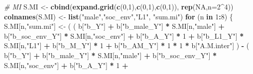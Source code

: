 \documentclass[
]{book}
\newenvironment{Shaded}{\begin{snugshade}}{\end{snugshade}}
\newcommand{\AttributeTok}[1]{\textcolor[rgb]{0.13,0.29,0.53}{#1}}
\newcommand{\CommentTok}[1]{\textcolor[rgb]{0.56,0.35,0.01}{\textit{#1}}}
\newcommand{\ConstantTok}[1]{\textcolor[rgb]{0.56,0.35,0.01}{#1}}
\newcommand{\ControlFlowTok}[1]{\textcolor[rgb]{0.13,0.29,0.53}{\textbf{#1}}}
\newcommand{\DecValTok}[1]{\textcolor[rgb]{0.00,0.00,0.81}{#1}}
\newcommand{\FunctionTok}[1]{\textcolor[rgb]{0.13,0.29,0.53}{\textbf{#1}}}
\newcommand{\NormalTok}[1]{#1}
\newcommand{\OtherTok}[1]{\textcolor[rgb]{0.56,0.35,0.01}{#1}}
\newcommand{\SpecialCharTok}[1]{\textcolor[rgb]{0.81,0.36,0.00}{\textbf{#1}}}
\newcommand{\StringTok}[1]{\textcolor[rgb]{0.31,0.60,0.02}{#1}}
\begin{document}
\begin{Shaded}
\begin{Highlighting}[]
  \CommentTok{\# MI }
\NormalTok{  S.MI }\OtherTok{\textless{}{-}} \FunctionTok{cbind}\NormalTok{(}\FunctionTok{expand.grid}\NormalTok{(}\FunctionTok{c}\NormalTok{(}\DecValTok{0}\NormalTok{,}\DecValTok{1}\NormalTok{),}\FunctionTok{c}\NormalTok{(}\DecValTok{0}\NormalTok{,}\DecValTok{1}\NormalTok{),}\FunctionTok{c}\NormalTok{(}\DecValTok{0}\NormalTok{,}\DecValTok{1}\NormalTok{)), }\FunctionTok{rep}\NormalTok{(}\ConstantTok{NA}\NormalTok{,}\AttributeTok{n=}\DecValTok{2}\SpecialCharTok{\^{}}\DecValTok{4}\NormalTok{))}
  \FunctionTok{colnames}\NormalTok{(S.MI) }\OtherTok{\textless{}{-}} \FunctionTok{list}\NormalTok{(}\StringTok{"male"}\NormalTok{,}\StringTok{"soc\_env"}\NormalTok{,}\StringTok{"L1"}\NormalTok{, }\StringTok{"sum.mi"}\NormalTok{)}
  \ControlFlowTok{for}\NormalTok{ (n }\ControlFlowTok{in} \DecValTok{1}\SpecialCharTok{:}\DecValTok{8}\NormalTok{) \{}
\NormalTok{    S.MI[n,}\StringTok{"sum.mi"}\NormalTok{] }\OtherTok{\textless{}{-}}\NormalTok{ ( ( b[}\StringTok{"b\_Y"}\NormalTok{] }\SpecialCharTok{+} 
\NormalTok{                              b[}\StringTok{"b\_male\_Y"}\NormalTok{] }\SpecialCharTok{*}\NormalTok{ S.MI[n,}\StringTok{"male"}\NormalTok{] }\SpecialCharTok{+} 
\NormalTok{                              b[}\StringTok{"b\_soc\_env\_Y"}\NormalTok{] }\SpecialCharTok{*}\NormalTok{ S.MI[n,}\StringTok{"soc\_env"}\NormalTok{] }\SpecialCharTok{+} 
\NormalTok{                              b[}\StringTok{"b\_A\_Y"}\NormalTok{] }\SpecialCharTok{*} \DecValTok{1} \SpecialCharTok{+} 
\NormalTok{                              b[}\StringTok{"b\_L1\_Y"}\NormalTok{] }\SpecialCharTok{*}\NormalTok{ S.MI[n,}\StringTok{"L1"}\NormalTok{] }\SpecialCharTok{+}
\NormalTok{                              b[}\StringTok{"b\_M\_Y"}\NormalTok{] }\SpecialCharTok{*} \DecValTok{1} \SpecialCharTok{+}
\NormalTok{                              b[}\StringTok{"b\_AM\_Y"}\NormalTok{] }\SpecialCharTok{*} \DecValTok{1} \SpecialCharTok{*} \DecValTok{1} \SpecialCharTok{*}\NormalTok{ b[}\StringTok{"A.M.inter"}\NormalTok{] ) }\SpecialCharTok{{-}} 
\NormalTok{                            ( b[}\StringTok{"b\_Y"}\NormalTok{] }\SpecialCharTok{+} 
\NormalTok{                                b[}\StringTok{"b\_male\_Y"}\NormalTok{] }\SpecialCharTok{*}\NormalTok{ S.MI[n,}\StringTok{"male"}\NormalTok{] }\SpecialCharTok{+} 
\NormalTok{                                b[}\StringTok{"b\_soc\_env\_Y"}\NormalTok{] }\SpecialCharTok{*}\NormalTok{ S.MI[n,}\StringTok{"soc\_env"}\NormalTok{] }\SpecialCharTok{+} 
\NormalTok{                                b[}\StringTok{"b\_A\_Y"}\NormalTok{] }\SpecialCharTok{*} \DecValTok{1} \SpecialCharTok{+} 

\end{Highlighting}
\end{Shaded}
\end{document}
